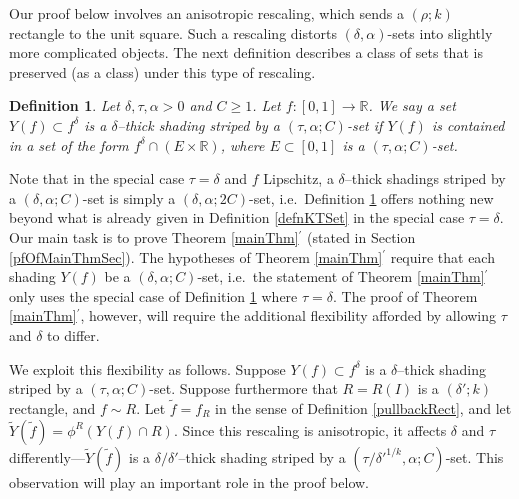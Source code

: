 \documentclass[letterpaper, reqno,11pt]{article}
\numberwithin{equation}{section}
\newcommand{\RR}{\mathbb{R}}
\numberwithin{thm}{section}
\newtheorem{defn}[thm]{Definition}
\theoremstyle{remark}
\begin{document}
Our proof below involves an anisotropic rescaling, which sends a $(\rho;k)$ rectangle to the unit square. Such a rescaling distorts $(\delta,\alpha)$-sets into slightly more complicated objects. The next definition describes a class of sets that is preserved (as a class) under this type of rescaling. 

\begin{defn}\label{defnOfStriped}
Let $\delta,\tau,\alpha>0$ and $C\geq 1$. Let $f\colon[0,1]\to\RR$. We say a set $Y(f)\subset f^\delta$ is a \emph{$\delta$--thick shading striped by a $(\tau,\alpha;C)$-set} if $Y(f)$ is contained in a set of the form $f^\delta\cap (E\times\RR)$, where $E\subset[0,1]$ is a $(\tau, \alpha;C)$-set.
\end{defn}

Note that in the special case $\tau=\delta$ and $f$ Lipschitz, a $\delta$--thick shadings striped by a $(\delta,\alpha;C)$-set is simply a $(\delta,\alpha; 2C)$-set, i.e.~Definition \ref{defnOfStriped} offers nothing new beyond what is already given in Definition \ref{defnKTSet} in the special case $\tau=\delta$. Our main task is to prove Theorem \ref{mainThm}$^\prime$ (stated in Section \ref{pfOfMainThmSec}). The hypotheses of Theorem \ref{mainThm}$^\prime$ require that each shading $Y(f)$ be a $(\delta,\alpha; C)$-set, i.e.~the statement of Theorem \ref{mainThm}$^\prime$ only uses the special case of Definition \ref{defnOfStriped} where $\tau=\delta$. The proof of Theorem \ref{mainThm}$^\prime$, however, will require the additional flexibility afforded by allowing $\tau$ and $\delta$ to differ. 

We exploit this flexibility as follows. Suppose $Y(f)\subset f^\delta$ is a $\delta$--thick shading striped by a $(\tau,\alpha;C)$-set. Suppose furthermore that $R=R(I)$ is a $(\delta';k)$ rectangle, and $f\sim R$. Let $\tilde f=f_R$ in the sense of Definition \ref{pullbackRect}, and let $\tilde Y(\tilde f)=\phi^R(Y(f)\cap R)$. Since this rescaling is anisotropic, it affects $\delta$ and $\tau$ differently---$\tilde Y(\tilde f)$ is a $\delta/\delta'$--thick shading striped by a $(\tau/\delta'^{1/k}, \alpha; C)$-set. This observation will play an important role in the proof below. 
\end{document}
